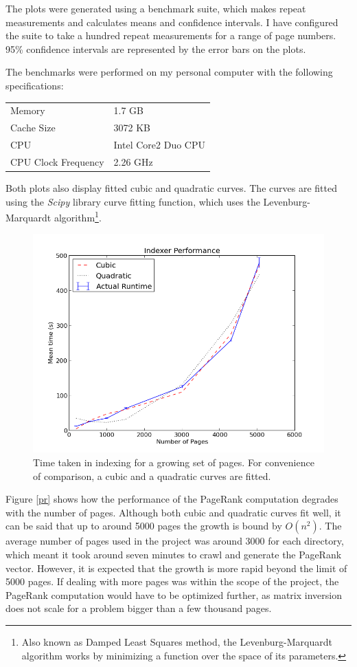 \documentclass[12pt,a4paper,notitlepage,twoside]{scrbook}
\begin{document}
The plots were generated using a benchmark suite, which makes repeat measurements and
calculates means and confidence intervals. I have configured the suite to take a hundred
repeat measurements for a range of page numbers. 95\% confidence intervals are represented by
the error bars on the plots.

The benchmarks were performed on my personal computer with the following specifications:

\begin{tabular}[h!]{l l}
Memory & 1.7 GB \\
Cache Size & 3072 KB \\
CPU & Intel Core2 Duo CPU \\
CPU Clock Frequency & 2.26 GHz \\
\end{tabular}

Both plots also display fitted cubic and quadratic curves. The curves are fitted using the
\textit{Scipy} library curve fitting function, which uses the Levenburg-Marquardt
algorithm\footnote{Also known as Damped Least Squares method, the Levenburg-Marquardt
algorithm works by minimizing a function over the space of its parameters.}. 
\begin{figure}[h!]
  \centering
    \includegraphics[width=0.8\linewidth]{figs/ind.png}
    \caption{Time taken in indexing for a growing set of pages. For convenience
	    of comparison, a cubic and a quadratic curves are fitted.\label{ind}}
\end{figure}
Figure \ref{pr} shows how the performance of the PageRank computation degrades with the
number of pages. Although both cubic and quadratic curves fit well, it can be said that
up to around 5000 pages the growth is bound by \(O(n^2)\). The average number of pages
used in the project was around 3000 for each directory, which meant it took around seven
minutes to crawl and generate the PageRank vector.  However, it is expected that the
growth is more rapid beyond the limit of 5000 pages. If dealing with more pages was within
the scope of the project, the PageRank computation would have to be optimized further, as
matrix inversion does not scale for a problem bigger than a few thousand pages.
\end{document}
